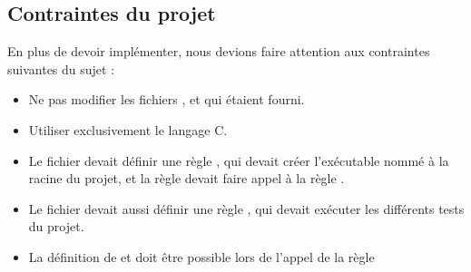 
\subsection{Contraintes du projet}

En plus de devoir implémenter, nous devions faire attention aux contraintes suivantes du sujet :

\begin{itemize}
    \item Ne pas modifier les fichiers ,  et  qui étaient fourni.
    \item Utiliser exclusivement le langage C.
    \item Le fichier  devait définir une règle , qui devait créer l'exécutable nommé  à la racine du projet, et la règle  devait faire appel à la règle .
    \item Le fichier  devait aussi définir une règle , qui devait exécuter les différents tests du projet.
    \item La définition de  et  doit être possible lors de l'appel de la règle 
\end{itemize}

